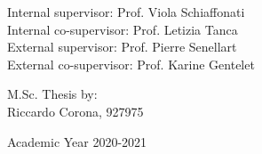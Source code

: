 {\begin{center}
\end{center}


\vspace{2.5cm}
\large
\begin{flushleft}
Internal supervisor: Prof. Viola Schiaffonati \\
Internal co-supervisor: Prof. Letizia Tanca \\
External supervisor: Prof. Pierre Senellart \\
External co-supervisor: Prof. Karine Gentelet \\
\end{flushleft}

\vspace{1cm}

\begin{flushright}
M.Sc. Thesis by: \\
{Riccardo Corona}, 927975 \\
\end{flushright}

\vspace{2cm}

\begin{center}
Academic Year 2020-2021
\end{center}

\clearpage
}

